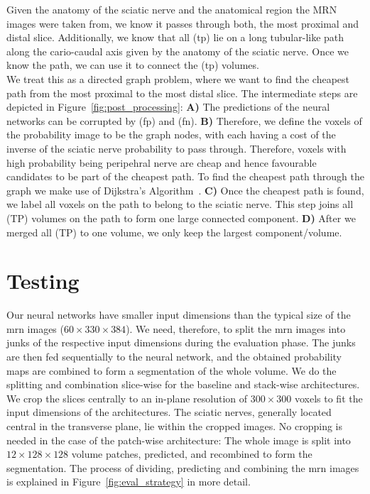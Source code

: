 Given the anatomy of the sciatic nerve and the anatomical region the MRN images were taken from, we know it passes through both, the most proximal and distal slice. Additionally, we know that all (\acrshort{tp}) lie on a long tubular-like path along the cario-caudal axis given by the anatomy of the sciatic nerve. Once we know the path, we can use it to connect the (\acrshort{tp}) volumes.\\
We treat this as a directed graph problem, where we want to find the cheapest path from the most proximal to the most distal slice. The intermediate steps are depicted in Figure~\ref{fig:post_processing}: \textbf{A)} The predictions of the neural networks can be corrupted by (\acrshort{fp}) and (\acrshort{fn}). \textbf{B)} Therefore, we define the voxels of the probability image to be the graph nodes, with each having a cost of the inverse of the sciatic nerve probability to pass through. Therefore, voxels with high probability being peripehral nerve are cheap and hence favourable candidates to be part of the cheapest path. To find the cheapest path through the graph we make use of Dijkstra's Algorithm~\cite{Dijkstra1959AGraphs}. \textbf{C)} Once the cheapest path is found, we label all voxels on the path to belong to the sciatic nerve. This step joins all (TP) volumes on the path to form one large connected component. \textbf{D)} After we merged all (TP) to one volume, we only keep the largest component/volume.

\section{Testing} \label{sec:testing}
Our neural networks have smaller input dimensions than the typical size of the \gls{mrn} images ($60 \times 330 \times 384$). We need, therefore, to split the \gls{mrn} images into junks of the respective input dimensions during the evaluation phase. The junks are then fed sequentially to the neural network, and the obtained probability maps are combined to form a segmentation of the whole volume. We do the splitting and combination slice-wise for the baseline and stack-wise architectures. We crop the slices centrally to an in-plane resolution of $300 \times 300$ voxels to fit the input dimensions of the architectures. The sciatic nerves, generally located central in the transverse plane, lie within the cropped images. No cropping is needed in the case of the patch-wise architecture: The whole image is split into $12 \times 128 \times 128$ volume patches, predicted, and recombined to form the segmentation. The process of dividing, predicting and combining the \gls{mrn} images is explained in Figure~\ref{fig:eval_strategy} in more detail.

